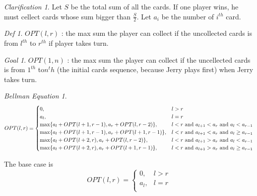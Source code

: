 \documentclass[10.5pt]{article}
\newenvironment{main idea}{\textbf{Main Idea: }}{}
\theoremstyle{remark}
\newtheorem*{define}{Def}
\newtheorem*{goal}{Goal}
\newtheorem*{clarification}{Clarification}
\newtheorem*{bellman}{Bellman Equation}
\begin{document}
\begin{main idea}
\begin{clarification}
	Let \(S\) be the total sum of all the cards. If one player wins, he must cellect cards whose sum bigger than \(\frac S2\). Let \(a_i\) be the number of \(i^{th}\) card.
\end{clarification}
\begin{define}
	\(OPT(l, r)\) : the max sum the player can collect if the uncollected cards is from \(l^{th}\) to \(r^{th}\) if player takes turn.
\end{define}
\begin{goal}
	\(OPT(1, n)\) : the max sum the player can collect if the uncellected cards is from \(1^{th}\) to\(n^th\) (the initial cards sequence, because Jerry plays first) when Jerry takes turn.
\end{goal}
\begin{bellman}
	\[
		OPT(l, r) =
		\begin{cases}
			0,                                                         & l > r                                                                 \\
			a_l,                                                       & l = r                                                                 \\
			\max \{a_l + OPT(l + 1, r - 1), a_r + OPT(l, r - 2)\},     & l < r \textup{ and } a_{l + 1} < a_r \textup{ and } a_l < a_{r - 1}   \\
			\max \{a_l + OPT(l + 1, r - 1), a_r + OPT(l + 1, r - 1)\}, & l < r \textup{ and } a_{l + 1} < a_r \textup{ and } a_l \ge a_{r - 1} \\
			\max \{a_l + OPT(l + 2, r), a_r + OPT(l, r - 2)\},         & l < r \textup{ and } a_{l + 1} > a_r \textup{ and } a_l < a_{r - 1}   \\
			\max \{a_l + OPT(l + 2, r), a_r + OPT(l + 1, r - 1)\},     & l < r \textup{ and } a_{l + 1} > a_r \textup{ and } a_l \ge a_{r - 1}
		\end{cases}
	\]
\end{bellman}
The base case is
\[
	OPT(l, r) =
	\begin{cases}
		0,   & l > r \\
		a_l, & l = r \\
	\end{cases}
\]
\newpage
\end{main idea}
\end{document}
